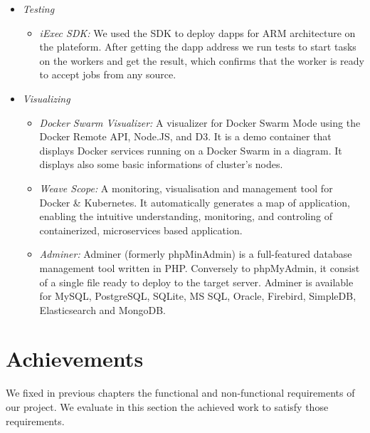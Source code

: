 \begin{itemize}
        \item \textit{Testing}
            \begin{itemize}
                \item \textit{iExec SDK: }
                We used the SDK to deploy dapps for ARM architecture on the plateform. After getting the dapp
                address we run tests to start tasks on the workers and get the result, which confirms that the
                worker is ready to accept jobs from any source.
            \end{itemize}

        \item \textit{Visualizing}
            \begin{itemize}
                \item \textit{Docker Swarm Visualizer: }
                A visualizer for Docker Swarm Mode using the Docker Remote API, Node.JS, and D3. It is a demo container
                that displays Docker services running on a Docker Swarm in a diagram. It displays also some basic
                informations of cluster's nodes.
                \item \textit{Weave Scope: }
                A monitoring, visualisation and management tool for Docker \& Kubernetes. It automatically generates
                a map of application, enabling the intuitive understanding, monitoring, and controling of containerized,
                microservices based application.
                \item \textit{Adminer: }            
                Adminer (formerly phpMinAdmin) is a full-featured database management tool written in PHP.
                Conversely to phpMyAdmin, it consist of a single file ready to deploy to the target server.
                Adminer is available for MySQL, PostgreSQL, SQLite, MS SQL, Oracle, Firebird, SimpleDB, Elasticsearch
                and MongoDB.
            \end{itemize}

    \end{itemize}

\section{Achievements}
    We fixed in previous chapters the functional and non-functional requirements of our project. We evaluate
    in this section the achieved work to satisfy those requirements.

